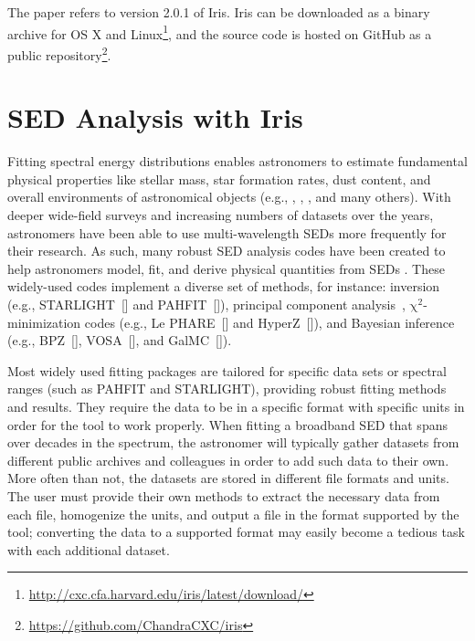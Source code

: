 \documentclass[preprint,authoryear,5p]{elsarticle}
\begin{document}
The paper refers to version 2.0.1 of Iris. Iris can be downloaded as a binary
archive for OS X and
Linux\footnote{\url{http://cxc.cfa.harvard.edu/iris/latest/download/}}, and the
source code is hosted on GitHub as a public
repository\footnote{\url{https://github.com/ChandraCXC/iris}}.

\section{SED Analysis with Iris} \label{sec:overview}

Fitting spectral energy distributions enables astron\-omers to estimate fundamental
physical properties like stellar mass, star formation rates, dust content, and
overall environments of astronomical objects (e.g., \citet{1998AJ....115.1329S},
\citet{2001ApJS..137..139S}, \citet{2007ApJS..169..328R}, and many others). With
deeper wide-field surveys and increasing numbers of datasets over the years,
astronomers have been able to use multi-wavelength SEDs more frequently for
their research. As such, many robust SED analysis codes have been created to
help astronomers mod\-el, fit, and derive physical quantities from SEDs
\citep{2011Ap&SS.331....1W,2013ARA&A..51..393C}. These widely-used codes
implement a diverse set of methods, for instance: inversion (e.g., 
STARLIGHT~[\citealp{2004MNRAS.355..273C}] and
PAHFIT~[\citealp{2007ApJ...656..770S}]),
principal component analysis~\citep[e.g.,][]{2009MNRAS.394.1496B},
$\mathrm{\chi}^{2}$-minimization codes 
(e.g., Le PHARE~[\citealp{1999MNRAS.310..540A,2006A&A...457..841I}] and 
HyperZ~[\citealp{2000A&A...363..476B}]), and Bayesian inference 
(e.g., BPZ~[\citealp{2000ApJ...536..571B}], 
VOSA~[\citealp{2008A&A...492..277B}], and 
GalMC~[\citealp{2011ApJ...737...47A}]).

Most widely used fitting packages are tailored for specific data sets or
spectral ranges (such as PAHFIT and STAR\-LIGHT), providing robust
fitting methods and results. They require the data to be in a specific format
with specific units in order for the tool to work properly. When fitting a
broadband SED that spans over decades in the spectrum, the astronomer will
typically gather datasets from different public archives and colleagues in order
to add such data to their own. More often than not, the datasets are stored in
different file formats and units. 
The user must provide their own methods to extract the necessary data from each
file, homogenize the units, and output a file in the format supported by the
tool; converting the data to a supported format may easily become a tedious task
with each additional dataset.
\end{document}
